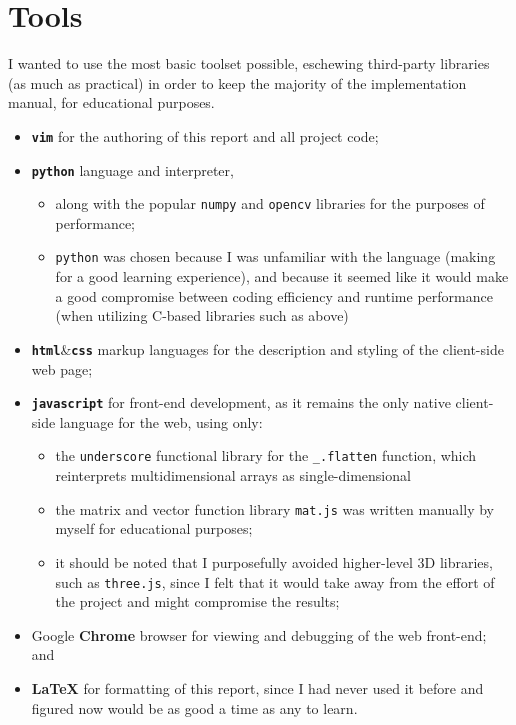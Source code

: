 \section{Tools}
I wanted to use the most basic toolset possible, eschewing third-party libraries (as much as practical) in order to keep the majority of the implementation manual, for educational purposes.
\begin{itemize}
\item \textbf{\texttt{vim}} for the authoring of this report and all project code;
\item \textbf{\texttt{python}} language and interpreter,
    \begin{itemize}
    \item along with the popular \verb!numpy! and \verb!opencv! libraries for the purposes of performance;
    \item \verb!python! was chosen because I was unfamiliar with the language (making for a good learning experience), and because it seemed like it would make a good compromise between coding efficiency and runtime performance (when utilizing C-based libraries such as above)
    \end{itemize}
\item \textbf{\texttt{html}}\&\textbf{\texttt{css}} markup languages for the description and styling of the client-side web page;
\item \textbf{\texttt{javascript}} for front-end development, as it remains the only native client-side language for the web, using only:
    \begin{itemize}
    \item the \verb!underscore! functional library for the \verb!_.flatten! function, which reinterprets multidimensional arrays as single-dimensional
    \item the matrix and vector function library \verb!mat.js! was written manually by myself for educational purposes;
    \item it should be noted that I purposefully avoided higher-level 3D libraries, such as \verb!three.js!, since I felt that it would take away from the effort of the project and might compromise the results;
    \end{itemize}
\item Google \textbf{Chrome} browser for viewing and debugging of the web front-end; and
\item \textbf{\LaTeX} for formatting of this report, since I had never used it before and figured now would be as good a time as any to learn.
\end{itemize}

